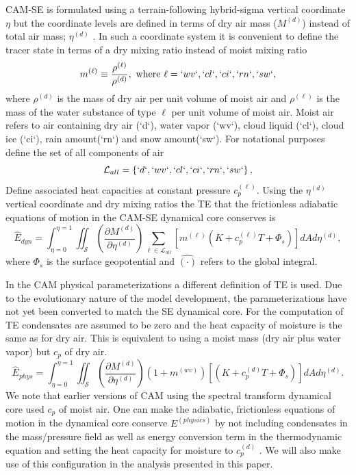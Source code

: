 \documentclass{agujournal}
\newcommand*{\gi}[1]{\widehat{#1}}
\begin{document}
CAM-SE is formulated using a terrain-following hybrid-sigma vertical coordinate $\eta$ but the coordinate levels are defined in terms of dry air mass ($M^{(d)}$) instead of total air mass; $\eta^{(d)}$ \citep[see ][ for details]{LetAl2018JAMES}. In such a coordinate system it is convenient to define the tracer state in terms of a dry mixing ratio instead of moist mixing ratio
\begin{equation}
m^{(\ell)}\equiv \frac{\rho^{(\ell)}}{\rho^{(d)}}, \text{ where }\ell=`wv`,`cl`,`ci`,`rn`,`sw`,\label{eq:mx}
\end{equation}
where $\rho^{(d)}$ is the mass of dry air per unit volume of moist air and $\rho^{(\ell)}$ is the mass of the water substance of type $\ell$ per unit volume of moist air. Moist air refers to air containing dry air (`d`), water vapor (`wv`), cloud liquid (`cl`), cloud ice (`ci`), rain amount(`rn`) and snow amount(`sw`). For notational purposes define the set of all components of air
\begin{equation}
\mathcal{L}_{all}=\left\{ `d`,`wv`,`cl`,`ci`,`rn`,`sw`\right\},
\end{equation}
Define associated heat capacities at constant pressure $c_p^{(\ell)}$. Using the $\eta^{(d)}$ vertical coordinate and dry mixing ratios the TE that the frictionless adiabatic equations of motion in the CAM-SE dynamical core conserves is 
\begin{equation}
\gi{E}_{dyn}=\int_{\eta=0}^{\eta=1} \iint_\mathcal{S} \left( \frac{\partial M^{(d)}}{\partial \eta^{(d)}} \right)\sum_{\ell \in \mathcal{L}_{all}} \left[m^{(\ell)} \left(K+c_p^{(\ell)}T+\Phi_s  \right)\right]  dA d \eta^{(d)},\label{eq:comprehensice_energy}
\end{equation}
where $\Phi_s$ is the surface geopotential and $\gi{(\cdot)}$ refers to the global integral.

In the CAM physical parameterizations a different definition of TE is used. Due to the evolutionary nature of the model development, the parameterizations have not yet been converted to match the SE dynamical core. For the computation of TE condensates are assumed to be zero and the heat capacity of moisture is the same as for dry air. This is equivalent to using a moist mass (dry air plus water vapor) but $c_p$ of dry air.
\begin{equation}
\label{eq:Ephys}
\gi{E}_{phys} =\int_{\eta=0}^{\eta=1} \iint_\mathcal{S} \left( \frac{\partial M^{(d)}}{\partial \eta^{(d)}} \right)\left(1+m^{(wv)}\right)\left[ \left(K+c_p^{(d)}T+\Phi_s\right)\right]dA d \eta^{(d)}.
\end{equation}
We note that earlier versions of CAM using the spectral transform dynamical core used $c_p$ of moist air. 
One can make the adiabatic, frictionless equations of motion in the dynamical core conserve $E^{(physics)}$ by not including condensates in the mass/pressure field as well as energy conversion term in the thermodynamic equation and setting the heat capacity for moisture to $c_p^{(d)}$ \citep{T2011LNCSEb}. We will also make use of this configuration in the analysis presented in this paper.
\end{document}
